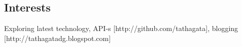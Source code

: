 \documentclass[a4paper, oneside, final]{scrartcl}
\begin{document}
\begin{center}
\section{Interests}
\small\sffamily{}
Exploring latest technology, API-s [http://github.com/tathagata], blogging [http://tathagatadg.blogspot.com]





\end{center}
\end{document}
